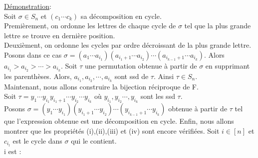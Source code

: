 			\underline{Démonstration}:\\
				Soit $\sigma \in S_{n}$ et $(c_{1}\cdots c_{k})$ sa décomposition en cycle.\\
				Premièrement, on ordonne les lettres de chaque cycle de $\sigma$ tel que la plus grande lettre se trouve en dernière position.\\
				Deuxièment, on ordonne les cycles par ordre décroissant de la plus grande lettre. Posons dans ce cas $ \sigma = (a_{1}\cdots a_{i_{1}})(a_{i_{1}+1}\cdots a_{i_{2}})\cdots(a_{i_{k-1}+1}\cdots a_{i_{k}}) $. Alors $ a_{i_{1}} >a_{i_{2}}>\cdots >a_{i_{k}} $. Soit $\tau$ une permutation obtenue à partir de $\sigma$ en supprimant les parenthèses. Alors, $ a_{i_{1}} ,a_{i_{2}},\cdots ,a_{i_{k}} $ sont ssd de $\tau$. Ainsi $\tau \in S_{n}$.\\
				Maintenant, nous allons construire la bijection réciproque de F.\\
				Soit $\tau = y_{1}\cdots y_{i_{1}}y_{i_{1}+1} \cdots y_{i_{2}} \cdots y_{i_{k}} $ où $y_{i_{1}}, y_{i_{2}}\cdots, y_{i_{k}} $ sont les ssd $\tau$.\\
				Posons $\sigma = (y_{1}\cdots y_{i_{1}})(y_{i_{1}+1}\cdots y_{i_{2}})\cdots(y_{i_{k-1}+1}\cdots y_{i_{k}})$ obtenue à partir de $\tau$ tel que l'expression obtenue est une décomposition en cycle. Enfin, nous allons montrer que les propriétés (i),(ii),(iii) et (iv) sont encore vérifiées. Soit $i\in[n]$ et $c_{i_{l}}$ est le cycle dans $\sigma$ qui le contient.\\
				i est :
